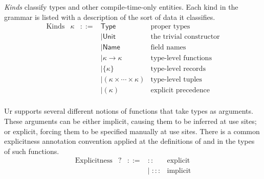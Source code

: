\documentclass{article}
\newcommand{\mt}[1]{\mathsf{#1}}
\begin{document}
\emph{Kinds} classify types and other compile-time-only entities.  Each kind in the grammar is listed with a description of the sort of data it classifies.
$$\begin{array}{rrcll}
  \textrm{Kinds} & \kappa &::=& \mt{Type} & \textrm{proper types} \\
  &&& \mid \mt{Unit} & \textrm{the trivial constructor} \\
  &&& \mid \mt{Name} & \textrm{field names} \\
  &&& \mid \kappa \to \kappa & \textrm{type-level functions} \\
  &&& \mid \{\kappa\} & \textrm{type-level records} \\
  &&& \mid (\kappa \times \cdots \times \kappa) & \textrm{type-level tuples} \\
  &&& \mid (\kappa) & \textrm{explicit precedence} \\
\end{array}$$

Ur supports several different notions of functions that take types as arguments.  These arguments can be either implicit, causing them to be inferred at use sites; or explicit, forcing them to be specified manually at use sites.  There is a common explicitness annotation convention applied at the definitions of and in the types of such functions.
$$\begin{array}{rrcll}
  \textrm{Explicitness} & ? &::=& :: & \textrm{explicit} \\
  &&& \mid \; ::: & \textrm{implicit}
\end{array}$$
\end{document}
